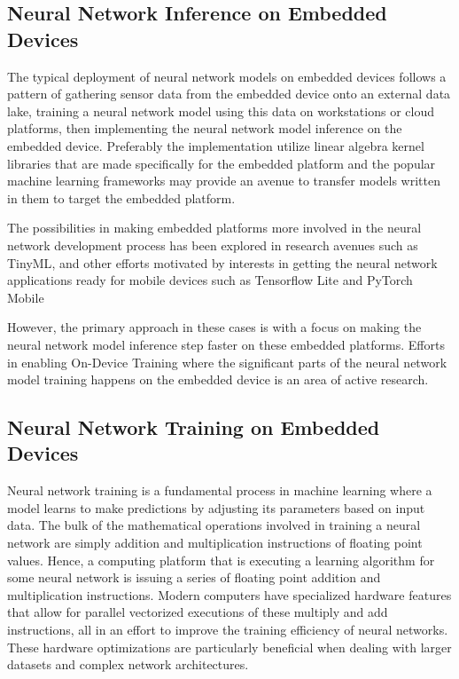 
\subsection{Neural Network Inference on Embedded Devices}

The typical deployment of neural network models on embedded devices follows a pattern of gathering sensor data from the embedded device onto an external data lake, training a neural network model using this data on workstations or cloud platforms, then implementing the neural network model inference on the embedded device. Preferably the implementation utilize linear algebra kernel libraries that are made specifically for the embedded platform and the popular machine learning frameworks may provide an avenue to transfer models written in them to target the embedded platform.

The possibilities in making embedded platforms more involved in the neural network development process has been explored in research avenues such as TinyML\cite{tinyml}, and other efforts motivated by interests in getting the neural network applications ready for mobile devices such as Tensorflow Lite\cite{tfl} and PyTorch Mobile \cite{pytorch-mobile}

However, the primary approach in these cases is with a focus on making the neural network model inference step faster on these embedded platforms. Efforts in enabling On-Device Training where the significant parts of the neural network model training happens on the embedded device is an area of active research.


\subsection{Neural Network Training on Embedded Devices}

Neural network training is a fundamental process in machine learning where a model learns to make predictions by adjusting its parameters based on input data. The bulk of the mathematical operations involved in training a neural network are simply addition and multiplication instructions of floating point values. Hence, a computing platform that is executing a learning algorithm for some neural network is issuing a series of floating point addition and multiplication instructions. Modern computers have specialized hardware features that allow for parallel vectorized executions of these multiply and add instructions, all in an effort to improve the training efficiency of neural networks. These hardware optimizations are particularly beneficial when dealing with larger datasets and complex network architectures.

